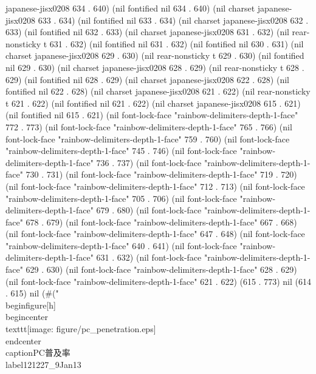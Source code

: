 japanese-jisx0208 634 . 640) (nil fontified nil 634 . 640) (nil charset japanese-jisx0208 633 . 634) (nil fontified nil 633 . 634) (nil charset japanese-jisx0208 632 . 633) (nil fontified nil 632 . 633) (nil charset japanese-jisx0208 631 . 632) (nil rear-nonsticky t 631 . 632) (nil fontified nil 631 . 632) (nil fontified nil 630 . 631) (nil charset japanese-jisx0208 629 . 630) (nil rear-nonsticky t 629 . 630) (nil fontified nil 629 . 630) (nil charset japanese-jisx0208 628 . 629) (nil rear-nonsticky t 628 . 629) (nil fontified nil 628 . 629) (nil charset japanese-jisx0208 622 . 628) (nil fontified nil 622 . 628) (nil charset japanese-jisx0208 621 . 622) (nil rear-nonsticky t 621 . 622) (nil fontified nil 621 . 622) (nil charset japanese-jisx0208 615 . 621) (nil fontified nil 615 . 621) (nil font-lock-face "rainbow-delimiters-depth-1-face" 772 . 773) (nil font-lock-face "rainbow-delimiters-depth-1-face" 765 . 766) (nil font-lock-face "rainbow-delimiters-depth-1-face" 759 . 760) (nil font-lock-face "rainbow-delimiters-depth-1-face" 745 . 746) (nil font-lock-face "rainbow-delimiters-depth-1-face" 736 . 737) (nil font-lock-face "rainbow-delimiters-depth-1-face" 730 . 731) (nil font-lock-face "rainbow-delimiters-depth-1-face" 719 . 720) (nil font-lock-face "rainbow-delimiters-depth-1-face" 712 . 713) (nil font-lock-face "rainbow-delimiters-depth-1-face" 705 . 706) (nil font-lock-face "rainbow-delimiters-depth-1-face" 679 . 680) (nil font-lock-face "rainbow-delimiters-depth-1-face" 678 . 679) (nil font-lock-face "rainbow-delimiters-depth-1-face" 667 . 668) (nil font-lock-face "rainbow-delimiters-depth-1-face" 647 . 648) (nil font-lock-face "rainbow-delimiters-depth-1-face" 640 . 641) (nil font-lock-face "rainbow-delimiters-depth-1-face" 631 . 632) (nil font-lock-face "rainbow-delimiters-depth-1-face" 629 . 630) (nil font-lock-face "rainbow-delimiters-depth-1-face" 628 . 629) (nil font-lock-face "rainbow-delimiters-depth-1-face" 621 . 622) (615 . 773) nil (614 . 615) nil (#("\\begin{figure}[h]
 \\begin{center}
  \\texttt{[image: figure/pc\_penetration.eps]}
 \\end{center}
 \\caption{PC普及率}
 \\label{121227_9Jan13}

